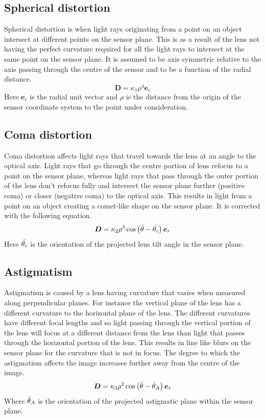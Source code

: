 \documentclass[[12pt,oneside,openany,a4paper, %
\newcommand*\mean[1]{\bar{#1}} %
\begin{document}
\subsection{Spherical distortion}
Spherical distortion is when light rays originating from a point on an object intersect at different points on the sensor plane. This is as a result of the lens not having the perfect curvature required for all the light rays to intersect at the same point on the sensor plane. It is assumed to be axis symmetric relative to the axis passing through the centre of the sensor and to be a function of the radial distance.
\begin{equation}
  \bm{D} = \kappa_1 \rho ^4 \bm{e}_r
\end{equation}
Here $\bm{e}_r$ is the radial unit vector and $\rho$ is the distance from the origin of the sensor coordinate system to the point under consideration.

\subsection{Coma distortion}
Coma distortion affects light rays that travel towards the lens at an angle to the optical axis. Light rays that go through the centre portion of lens refocus to a point on the sensor plane, whereas light rays that pass through the outer portion of the lens don't refocus fully and intersect the sensor plane further (positive coma) or closer (negative coma) to the optical axis. This results in light from a point on an object creating a comet-like shape on the sensor plane. It is corrected with the following equation.
\begin{equation}
  \bm{D} = \kappa_2 \rho^3 \cos \left( \mean{\theta} - \mean{\theta_c} \right) \bm{e}_r
\end{equation}
Here $\mean{\theta_c}$ is the orientation of the projected lens tilt angle in the sensor plane.

\subsection{Astigmatism}
Astigmatism is caused by a lens having curvature that varies when measured along perpendicular planes. For instance the vertical plane of the lens has a different curvature to the horizontal plane of the lens. The different curvatures have different focal lengths and so light passing through the vertical portion of the lens will focus at a different distance from the lens than light that passes through the horizontal portion of the lens. This results in line like blurs on the sensor plane for the curvature that is not in focus. The degree to which the astigmatism affects the image increases further away from the centre of the image.
\begin{equation}
  \bm{D} = \kappa_3 \rho^2 \cos \left( \mean{\theta} - \mean{\theta}_A \right) \bm{e}_r
\end{equation}
Where $\mean{\theta}_A$ is the orientation of the projected astigmatic plane within the sensor plane.
\end{document}
